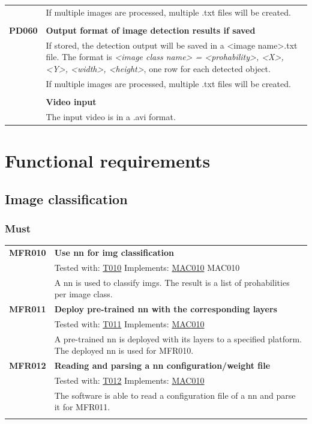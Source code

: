 \documentclass[parskip=full]{scrartcl}
\begin{document}
\begin{tabular}{p{2cm}p{11.4cm}}
& If multiple images are processed, multiple .txt files will be created.\\
& \\
\textbf{PD060}\hypertarget{PD060} & \textbf{Output format of image detection results if saved}\\
& If stored, the detection output will be saved in a <image name>.txt file. The format is \textit{<image class name> = <prohability>, <X>, <Y>, <width>, <height>}, one row for each detected object.\\
& If multiple images are processed, multiple .txt files will be created.\\
& \\
\textbf{PD070\hypertarget{PD070}} & \textbf{Video input}\\
& The input video is in a .avi format.
\end{tabular}
\newpage
\section{Functional requirements}
\subsection{Image classification}
\subsubsection{Must}
\begin{tabular}{p{2cm}p{11.4cm}}
\textbf{MFR010}\hypertarget{MFR010} & \textbf{Use \gls{nn} for \gls{img} classification}\\
& Tested with: \hyperlink{T010}{T010} Implements: \hyperlink{MAC010}{MAC010} MAC010 \\                                    
& A \gls{nn} is used to classify \glspl{img}. The result is a list of prohabilities per image class.\\
\textbf{MFR011}\hypertarget{MFR011} & \textbf{Deploy pre-trained \gls{nn} with the corresponding layers}\\
& Tested with: \hyperlink{T011}{T011} Implements: \hyperlink{MAC010}{MAC010} \\
& A pre-trained \gls{nn} is deployed with its layers to a specified platform. The deployed \gls{nn} is used for MFR010.\\
\textbf{MFR012} \hypertarget{MFR012}& \textbf{Reading and parsing a \gls{nn} configuration/weight file}\\
& Tested with: \hyperlink{T012}{T012} Implements: \hyperlink{MAC010}{MAC010} \\
& The software is able to read a configuration file of a \gls{nn} and parse it for MFR011.\\
& \\
\end{tabular}
\end{document}
